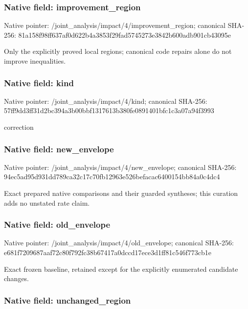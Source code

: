 \documentclass[10pt,a4paper]{article}
\begin{document}
\subsubsection{Native field: improvement\_region}


Native pointer: /joint\_analysis/impact/4\allowbreak{}/improvement\_region; canonical SHA-256: 81a158f98ff637af0d622b4a\allowbreak{}3853f29fad5745273e3842b6\allowbreak{}00adb901cb43095e


Only the explicitly proved local regions; canonical code repairs alone do not improve inequalities.


\subsubsection{Native field: kind}


Native pointer: /joint\_analysis/impact/4/kind; canonical SHA-256: 57ff9dd3ff31d2bc394a3b00\allowbreak{}bbf1317613b380fe0891401b\allowbreak{}fc1c3a07a94f3993


correction


\subsubsection{Native field: new\_envelope}


Native pointer: /joint\_analysis/impact/4/new\_envelope; canonical SHA-256: 94ec5ad95d931dd789ca32c1\allowbreak{}7c70fb12963e526befacac64\allowbreak{}00154bb84a0c4dc4


Exact prepared native comparisons and their guarded syntheses; this curation adds no unstated rate claim.


\subsubsection{Native field: old\_envelope}


Native pointer: /joint\_analysis/impact/4/old\_envelope; canonical SHA-256: e681f7209687aaf72c80f792\allowbreak{}fc38b67417a0dccd17ece3d1\allowbreak{}ff81c546f773cb1e


Exact frozen baseline, retained except for the explicitly enumerated candidate changes.


\subsubsection{Native field: unchanged\_region}
\end{document}
